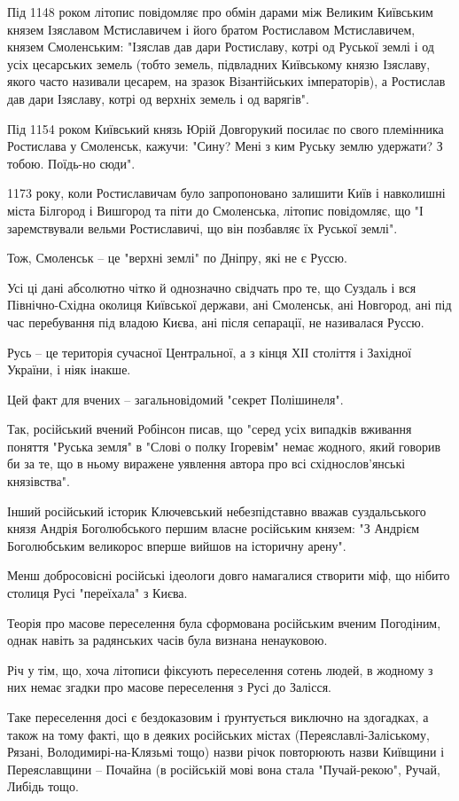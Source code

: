 Під 1148 роком літопис повідомляє про обмін дарами між Великим Київським князем
Ізяславом Мстиславичем і його братом Ростиславом Мстиславичем, князем
Смоленським: "Ізяслав дав дари Ростиславу, котрі од Руської землі і од усіх
цесарських земель (тобто земель, підвладних Київському князю Ізяславу, якого
часто називали цесарем, на зразок Візантійських імператорів), а Ростислав дав
дари Ізяславу, котрі од верхніх земель і од варягів".

Під 1154 роком Київський князь Юрій Довгорукий посилає по свого племінника
Ростислава у Смоленськ, кажучи: "Сину? Мені з ким Руську землю удержати? З
тобою. Поїдь-но сюди".

1173 року, коли Ростиславичам було запропоновано залишити Київ і навколишні
міста Білгород і Вишгород та піти до Смоленська, літопис повідомляє, що "І
заремствували вельми Ростиславичі, що він позбавляє їх Руської землі".

Тож, Смоленськ – це "верхні землі" по Дніпру, які не є Руссю.

Усі ці дані абсолютно чітко й однозначно свідчать про те, що Суздаль і вся
Північно-Східна околиця Київської держави, ані Смоленськ, ані Новгород, ані під
час перебування під владою Києва, ані після сепарації, не називалася Руссю.

Русь – це територія сучасної Центральної, а з кінця ХІІ століття і Західної
України, і ніяк інакше.

Цей факт для вчених – загальновідомий "секрет Полішинеля".

Так, російський вчений Робінсон писав, що "серед усіх випадків вживання поняття
"Руська земля" в "Слові о полку Ігоревім" немає жодного, який говорив би за те,
що в ньому виражене уявлення автора про всі східнослов'янські князівства".

Інший російський історик Ключевський небезпідставно вважав суздальського князя
Андрія Боголюбського першим власне російським князем: "З Андрієм Боголюбським
великорос вперше вийшов на історичну арену".

Менш добросовісні російські ідеологи довго намагалися створити міф, що нібито
столиця Русі "переїхала" з Києва.

Теорія про масове переселення була сформована російським вченим Погодіним,
однак навіть за радянських часів була визнана ненауковою.

Річ у тім, що, хоча літописи фіксують переселення сотень людей, в жодному з них
немає згадки про масове переселення з Русі до Залісся.

Таке переселення досі є бездоказовим і ґрунтується виключно на здогадках, а
також на тому факті, що в деяких російських містах (Переяславлі-Заліському,
Рязані, Володимирі-на-Клязьмі тощо) назви річок повторюють назви Київщини і
Переяславщини – Почайна (в російській мові вона стала "Пучай-рекою", Ручай,
Либідь тощо.

